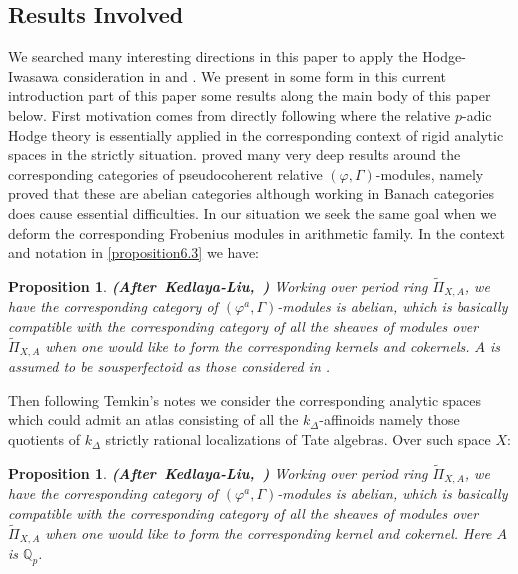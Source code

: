 \documentclass[12pt]{amsart}
\newtheorem{proposition}[theorem]{Proposition}
\theoremstyle{definition}
\numberwithin{equation}{section}
\begin{document}
\subsection{Results Involved}

\indent We searched many interesting directions in this paper to apply the Hodge-Iwasawa consideration in \cite{XT1} and \cite{XT2}. We present in some form in this current introduction part of this paper some results along the main body of this paper below. First motivation comes from directly following \cite{KL16} where the relative $p$-adic Hodge theory is essentially applied in the corresponding context of rigid analytic spaces in the strictly situation. \cite{KL16} proved many very deep results around the corresponding categories of pseudocoherent relative $(\varphi,\Gamma)$-modules, namely \cite{KL16} proved that these are abelian categories although working in Banach categories does cause essential difficulties. In our situation we seek the same goal when we deform the corresponding Frobenius modules in arithmetic family. In the context and notation in \cref{proposition6.3} we have:


\begin{proposition} \mbox{\bf{(After Kedlaya-Liu, \cite[Theorem 8.10.6]{KL16})}} 
Working over period ring $\widetilde{\Pi}_{X,A}$, we have the corresponding category of $(\varphi^a,\Gamma)$-modules is abelian, which is basically compatible with the corresponding category of all the sheaves of modules over $\widetilde{\Pi}_{X,A}$ when one would like to form the corresponding kernels and cokernels. $A$ is assumed to be sousperfectoid as those considered in \cite{KH}.
\end{proposition}


\indent Then following Temkin's notes \cite[Part I Chapter I]{DFN} we consider the corresponding analytic spaces which could admit an atlas consisting of all the $k_\Delta$-affinoids namely those quotients of $k_\Delta$ strictly rational localizations of Tate algebras. Over such space $X$: 

\begin{proposition} \mbox{\bf{(After Kedlaya-Liu, \cite[Theorem 8.10.6]{KL16})}} 
Working over period ring $\widetilde{\Pi}_{X,A}$, we have the corresponding category of $(\varphi^a,\Gamma)$-modules is abelian, which is basically compatible with the corresponding category of all the sheaves of modules over $\widetilde{\Pi}_{X,A}$ when one would like to form the corresponding kernel and cokernel. Here $A$ is $\mathbb{Q}_p$.
\end{proposition}
\end{document}
